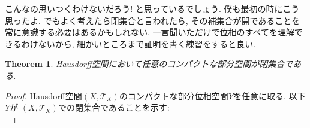 \documentclass[dvipdfmx]{jbook}
\newtheorem{theorem}{Theorem}[section]
\theoremstyle{remark}
\theoremstyle{plain}
\begin{document}
こんなの思いつくわけないだろう! と思っているでしょう. 僕も最初の時にこう思ったよ. 
でもよく考えたら閉集合と言われたら, その補集合が開であることを常に意識する必要はあるかもしれない. 
一言聞いただけで位相のすべてを理解できるわけないから, 細かいところまで証明を書く練習をすると良い.

\begin{theorem}
	Hausdorff空間において任意のコンパクトな部分空間が閉集合である.
\end{theorem}

\begin{proof}
	Hausdorff空間$\left( X , \mathcal{T}_{X} \right)$のコンパクトな部分位相空間$Y$を任意に取る.
	以下$Y$が $\left(  X, \mathcal{T}_{X} \right)$での閉集合であることを示す:\\

\end{proof}
\end{document}

